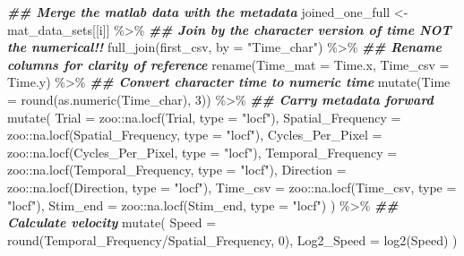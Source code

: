 \documentclass[
]{book}
\newenvironment{Shaded}{\begin{snugshade}}{\end{snugshade}}
\newcommand{\AttributeTok}[1]{\textcolor[rgb]{0.77,0.63,0.00}{#1}}
\newcommand{\DecValTok}[1]{\textcolor[rgb]{0.00,0.00,0.81}{#1}}
\newcommand{\DocumentationTok}[1]{\textcolor[rgb]{0.56,0.35,0.01}{\textbf{\textit{#1}}}}
\newcommand{\FunctionTok}[1]{\textcolor[rgb]{0.00,0.00,0.00}{#1}}
\newcommand{\NormalTok}[1]{#1}
\newcommand{\OtherTok}[1]{\textcolor[rgb]{0.56,0.35,0.01}{#1}}
\newcommand{\SpecialCharTok}[1]{\textcolor[rgb]{0.00,0.00,0.00}{#1}}
\newcommand{\StringTok}[1]{\textcolor[rgb]{0.31,0.60,0.02}{#1}}
\begin{document}
\begin{Shaded}
\begin{Highlighting}[]
  \DocumentationTok{\#\# Merge the matlab data with the metadata}
\NormalTok{  joined\_one\_full }\OtherTok{\textless{}{-}}
\NormalTok{    mat\_data\_sets[[i]] }\SpecialCharTok{\%\textgreater{}\%}
    \DocumentationTok{\#\# Join by the character version of time NOT the numerical!!}
    \FunctionTok{full\_join}\NormalTok{(first\_csv, }\AttributeTok{by =} \StringTok{"Time\_char"}\NormalTok{) }\SpecialCharTok{\%\textgreater{}\%}
    \DocumentationTok{\#\# Rename columns for clarity of reference}
    \FunctionTok{rename}\NormalTok{(}\AttributeTok{Time\_mat =}\NormalTok{ Time.x,}
           \AttributeTok{Time\_csv =}\NormalTok{ Time.y) }\SpecialCharTok{\%\textgreater{}\%}
    \DocumentationTok{\#\# Convert character time to numeric time}
    \FunctionTok{mutate}\NormalTok{(}\AttributeTok{Time =} \FunctionTok{round}\NormalTok{(}\FunctionTok{as.numeric}\NormalTok{(Time\_char), }\DecValTok{3}\NormalTok{)) }\SpecialCharTok{\%\textgreater{}\%}
    \DocumentationTok{\#\# Carry metadata forward}
    \FunctionTok{mutate}\NormalTok{(}
      \AttributeTok{Trial =}\NormalTok{ zoo}\SpecialCharTok{::}\FunctionTok{na.locf}\NormalTok{(Trial, }\AttributeTok{type =} \StringTok{"locf"}\NormalTok{),}
      \AttributeTok{Spatial\_Frequency =}\NormalTok{ zoo}\SpecialCharTok{::}\FunctionTok{na.locf}\NormalTok{(Spatial\_Frequency, }\AttributeTok{type =} \StringTok{"locf"}\NormalTok{),}
      \AttributeTok{Cycles\_Per\_Pixel  =}\NormalTok{ zoo}\SpecialCharTok{::}\FunctionTok{na.locf}\NormalTok{(Cycles\_Per\_Pixel, }\AttributeTok{type =} \StringTok{"locf"}\NormalTok{),}
      \AttributeTok{Temporal\_Frequency =}\NormalTok{ zoo}\SpecialCharTok{::}\FunctionTok{na.locf}\NormalTok{(Temporal\_Frequency, }\AttributeTok{type =} \StringTok{"locf"}\NormalTok{),}
      \AttributeTok{Direction =}\NormalTok{ zoo}\SpecialCharTok{::}\FunctionTok{na.locf}\NormalTok{(Direction, }\AttributeTok{type =} \StringTok{"locf"}\NormalTok{),}
      \AttributeTok{Time\_csv =}\NormalTok{ zoo}\SpecialCharTok{::}\FunctionTok{na.locf}\NormalTok{(Time\_csv, }\AttributeTok{type =} \StringTok{"locf"}\NormalTok{),}
      \AttributeTok{Stim\_end =}\NormalTok{ zoo}\SpecialCharTok{::}\FunctionTok{na.locf}\NormalTok{(Stim\_end, }\AttributeTok{type =} \StringTok{"locf"}\NormalTok{)}
\NormalTok{    ) }\SpecialCharTok{\%\textgreater{}\%}
    \DocumentationTok{\#\# Calculate velocity}
    \FunctionTok{mutate}\NormalTok{(}
      \AttributeTok{Speed =} \FunctionTok{round}\NormalTok{(Temporal\_Frequency}\SpecialCharTok{/}\NormalTok{Spatial\_Frequency, }\DecValTok{0}\NormalTok{),}
      \AttributeTok{Log2\_Speed =} \FunctionTok{log2}\NormalTok{(Speed)}
\NormalTok{    )}


\end{Highlighting}
\end{Shaded}
\end{document}

